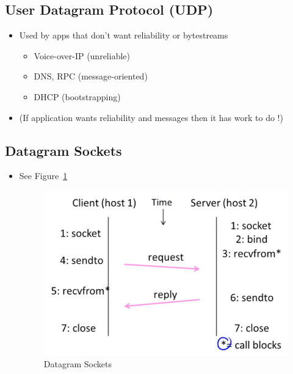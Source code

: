 \documentclass[12pt]{ctexart}   %
\begin{document}
	\subsection{ User Datagram Protocol (UDP) }
	\begin{itemize}
		\item Used by apps that don't want reliability or bytestreams
		\begin{itemize}
			\item Voice-over-IP (unreliable)
			\item DNS, RPC (message-oriented)
			\item DHCP (bootstrapping)
		\end{itemize}
		
		\item (If application wants reliability and messages then it has work to do !)
	\end{itemize}
	
	\subsection{ Datagram Sockets }
	\begin{itemize}
		\item See Figure~\ref{fig:6-2-2}
		 
		 \begin{figure}[h!] %
		\centering
		 \includegraphics[scale=0.7]{images/6-2-2}
		\caption{ Datagram Sockets }
		 \label{fig:6-2-2}
		 \end{figure}
	\end{itemize}
	
\end{document}
